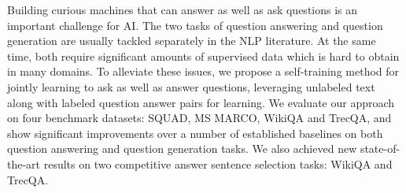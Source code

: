 Building curious machines that can answer as well as ask questions is an important challenge for AI. The two tasks of question answering and question generation are usually tackled separately in the NLP literature. At the same time, both require significant amounts of supervised data which is hard to obtain in many domains. To alleviate these issues, we propose a self-training method for jointly learning to ask as well as answer questions, leveraging unlabeled text along with labeled question answer pairs for learning. We evaluate our approach on four benchmark datasets: SQUAD, MS MARCO, WikiQA and TrecQA, and show significant improvements over a number of established baselines on both question answering and question generation tasks. We also achieved new state-of-the-art results on two competitive answer sentence selection tasks: WikiQA and TrecQA.
